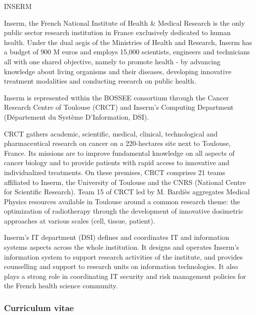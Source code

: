 \begin{sitedescription}{INSERM}

Inserm, the French National Institute of Health \& Medical Research is the only
public sector research institution in France exclusively dedicated to human
health. Under the dual aegis of the Ministries of Health and Research, Inserm
has a budget of 900 M euros and employs 15,000 scientists, engineers and
technicians all with one shared objective, namely to promote health - by
advancing knowledge about living organisms and their diseases, developing
innovative treatment modalities and conducting research on public health.

Inserm is represented within the BOSSEE consortium through the Cancer Research
Centre of Toulouse (CRCT) and Inserm’s Computing Department (D\'epartement du
Système D’Information, DSI).

CRCT gathers academic, scientific, medical, clinical, technological and
pharmaceutical research on cancer on a 220-hectares site next to Toulouse,
France. Its missions are to improve fundamental knowledge on all aspects of
cancer biology and to provide patients with rapid access to innovative and
individualized treatments. On these premises, CRCT comprises 21 teams
affiliated to Inserm, the University of Toulouse and the CNRS (National Centre
for Scientific Research). Team 15 of CRCT led by M. Bardi\`es aggregates
Medical Physics resources available in Toulouse around a common research theme:
the optimization of radiotherapy through the development of innovative
dosimetric approaches at various scales (cell, tissue, patient).

Inserm's IT department (DSI) defines and coordinates IT and information systems
aspects across the whole institution. It designs and operates Inserm's
information system to support research activities of the institute, and
provides counselling and support to research units on information technologies.
It also plays a strong role in coordinating IT security and risk management
policies for the French health science community.

%

\subsubsection*{Curriculum vitae}






\end{sitedescription}
